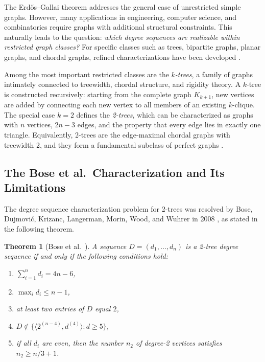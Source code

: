 \documentclass[12pt]{article}
\newtheorem{theorem}{Theorem}[section]
\numberwithin{equation}{section}
\begin{document}
The Erd\H{o}s--Gallai theorem addresses the general case of unrestricted simple graphs.
However, many applications in engineering, computer science, and combinatorics require graphs with additional structural constraints.
This naturally leads to the question: \emph{which degree sequences are realizable within restricted graph classes?}
For specific classes such as trees, bipartite graphs, planar graphs, and chordal graphs, refined characterizations have been developed \cite{gale1957,hakimi1962,asratian1998}.

Among the most important restricted classes are the \emph{$k$-trees}, a family of graphs intimately connected to treewidth, chordal structure, and rigidity theory.
A $k$-tree is constructed recursively: starting from the complete graph $K_{k+1}$, new vertices are added by connecting each new vertex to all members of an existing $k$-clique.
The special case $k=2$ defines the \emph{2-trees}, which can be characterized as graphs with $n$ vertices, $2n-3$ edges, and the property that every edge lies in exactly one triangle.
Equivalently, 2-trees are the edge-maximal chordal graphs with treewidth 2, and they form a fundamental subclass of perfect graphs \cite{golumbic2004}.

\subsection{The Bose et al.\ Characterization and Its Limitations}

The degree sequence characterization problem for 2-trees was resolved by Bose, Dujmovi\'c, Krizanc, Langerman, Morin, Wood, and Wuhrer in 2008 \cite{bose2008}, as stated in the following theorem.

\begin{theorem}[Bose et al.\ \cite{bose2008}]
\label{thm:bose}
A sequence $D=(d_1,\dots,d_n)$ is a 2-tree degree sequence if and only if the following conditions hold:
\begin{enumerate}
\item[(i)] $\sum_{i=1}^n d_i = 4n-6$,
\item[(ii)] $\max_i d_i \le n-1$,
\item[(iii)] at least two entries of $D$ equal $2$,
\item[(iv)] $D\notin\{\langle 2^{(n-4)},d^{(4)}\rangle:d\ge 5\}$,
\item[(v)] if all $d_i$ are even, then the number $n_2$ of degree-2 vertices satisfies $n_2\ge n/3+1$.
\end{enumerate}
\end{theorem}
\end{document}

